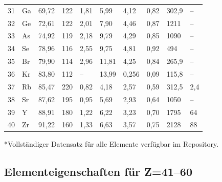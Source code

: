 \documentclass[12pt,a4paper]{article}
\begin{document}
\begin{longtable}{p{0.6cm}p{1.2cm}p{1.2cm}p{1.2cm}p{1.2cm}p{1.2cm}p{1.5cm}p{1.2cm}p{1.2cm}p{1.2cm}}
		31 & Ga & 69,72 & 122 & 1,81 & 5,99 & 4,12 & 0,82 & 302,9 & – \\
		32 & Ge & 72,61 & 122 & 2,01 & 7,90 & 4,46 & 0,87 & 1211 & – \\
		33 & As & 74,92 & 119 & 2,18 & 9,79 & 4,29 & 0,85 & 1090 & – \\
		34 & Se & 78,96 & 116 & 2,55 & 9,75 & 4,81 & 0,92 & 494 & – \\
		35 & Br & 79,90 & 114 & 2,96 & 11,81 & 4,25 & 0,84 & 265,9 & – \\
		36 & Kr & 83,80 & 112 & –    & 13,99 & 0,256 & 0,09 & 115,8 & – \\
		37 & Rb & 85,47 & 220 & 0,82 & 4,18 & 2,57 & 0,59 & 312,5 & 2,4 \\
		38 & Sr & 87,62 & 195 & 0,95 & 5,69 & 2,93 & 0,64 & 1050 & – \\
		39 & Y  & 88,91 & 180 & 1,22 & 6,22 & 3,23 & 0,70 & 1795 & 64 \\
		40 & Zr & 91,22 & 160 & 1,33 & 6,63 & 3,57 & 0,75 & 2128 & 88 \\
		\bottomrule
	\end{longtable}
	*Vollständiger Datensatz für alle Elemente verfügbar im Repository.
	
	\subsection*{Elementeigenschaften für Z=41–60}
	
\end{document}
